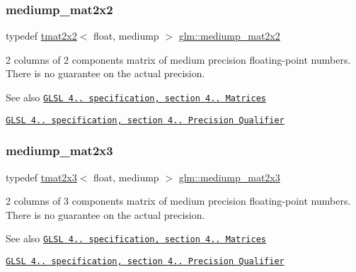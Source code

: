 \subsubsection{\texorpdfstring{mediump\+\_\+mat2x2}{mediump\_mat2x2}}
{\footnotesize\ttfamily typedef \hyperlink{structglm_1_1tmat2x2}{tmat2x2}$<$ float, mediump $>$ \hyperlink{group__core__precision_ga7f27d5d720010e94d8a98eaaaf7f1f32}{glm\+::mediump\+\_\+mat2x2}}

2 columns of 2 components matrix of medium precision floating-\/point numbers. There is no guarantee on the actual precision.

\begin{DoxySeeAlso}{See also}
\href{http://www.opengl.org/registry/doc/GLSLangSpec.4.20.8.pdf}{\tt G\+L\+SL 4.. specification, section 4.. Matrices} 

\href{http://www.opengl.org/registry/doc/GLSLangSpec.4.20.8.pdf}{\tt G\+L\+SL 4.. specification, section 4.. Precision Qualifier} 
\end{DoxySeeAlso}
\mbox{\label{group__core__precision_ga39eba94b5dc46f46481c9c4428609731}} 
\subsubsection{\texorpdfstring{mediump\+\_\+mat2x3}{mediump\_mat2x3}}
{\footnotesize\ttfamily typedef \hyperlink{structglm_1_1tmat2x3}{tmat2x3}$<$ float, mediump $>$ \hyperlink{group__core__precision_ga39eba94b5dc46f46481c9c4428609731}{glm\+::mediump\+\_\+mat2x3}}

2 columns of 3 components matrix of medium precision floating-\/point numbers. There is no guarantee on the actual precision.

\begin{DoxySeeAlso}{See also}
\href{http://www.opengl.org/registry/doc/GLSLangSpec.4.20.8.pdf}{\tt G\+L\+SL 4.. specification, section 4.. Matrices} 

\href{http://www.opengl.org/registry/doc/GLSLangSpec.4.20.8.pdf}{\tt G\+L\+SL 4.. specification, section 4.. Precision Qualifier} 
\end{DoxySeeAlso}
\mbox{\label{group__core__precision_ga61617ba8393bbebc94ee813403aa54a9}} 
